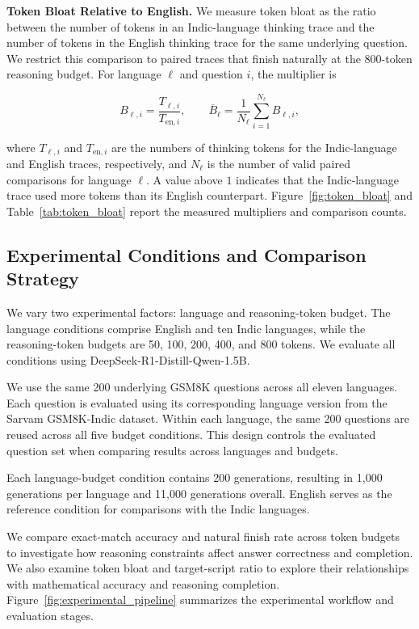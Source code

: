 \documentclass[11pt]{article}
\begin{document}
\textbf{Token Bloat Relative to English.}
We measure token bloat as the ratio between the number of tokens in an Indic-language thinking trace and the number of tokens in the English thinking trace for the same underlying question. We restrict this comparison to paired traces that finish naturally at the 800-token reasoning budget. For language $\ell$ and question $i$, the multiplier is

\begin{equation}
B_{\ell,i} = \frac{T_{\ell,i}}{T_{\mathrm{en},i}}, \qquad
\overline{B}_{\ell} = \frac{1}{N_{\ell}}\sum_{i=1}^{N_{\ell}} B_{\ell,i},
\label{eq:token_bloat}
\end{equation}

where $T_{\ell,i}$ and $T_{\mathrm{en},i}$ are the numbers of thinking tokens for the Indic-language and English traces, respectively, and $N_{\ell}$ is the number of valid paired comparisons for language $\ell$. A value above $1$ indicates that the Indic-language trace used more tokens than its English counterpart. Figure~\ref{fig:token_bloat} and Table~\ref{tab:token_bloat} report the measured multipliers and comparison counts.



\subsection{Experimental Conditions and Comparison Strategy}
\label{sec:comparison_strategy}

We vary two experimental factors: language and reasoning-token budget. The language conditions comprise English and ten Indic languages, while the reasoning-token budgets are 50, 100, 200, 400, and 800 tokens. We evaluate all conditions using DeepSeek-R1-Distill-Qwen-1.5B.

We use the same 200 underlying GSM8K questions across all eleven languages. Each question is evaluated using its corresponding language version from the Sarvam GSM8K-Indic dataset. Within each language, the same 200 questions are reused across all five budget conditions. This design controls the evaluated question set when comparing results across languages and budgets.

Each language-budget condition contains 200 generations, resulting in 1,000 generations per language and 11,000 generations overall. English serves as the reference condition for comparisons with the Indic languages.

We compare exact-match accuracy and natural finish rate across token budgets to investigate how reasoning constraints affect answer correctness and completion. We also examine token bloat and target-script ratio to explore their relationships with mathematical accuracy and reasoning completion. Figure~\ref{fig:experimental_pipeline} summarizes the experimental workflow and evaluation stages.
\end{document}
